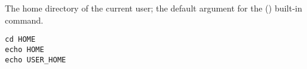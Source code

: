 \label{par:user_home}

The home directory of the current user; the default argument for
the  () built-in command.

\begin{lstlisting}[style=Groovybash, label={lst:example_user_home}]
cd HOME
echo HOME
echo USER_HOME
\end{lstlisting}

